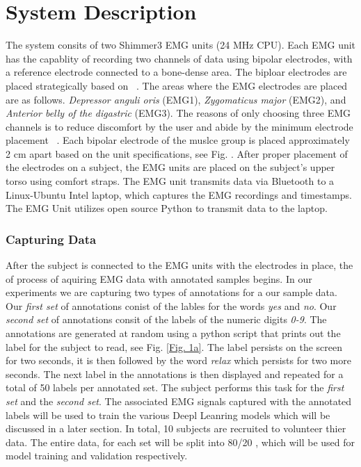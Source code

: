 \documentclass[conference]{IEEEtran}
\begin{document}
\section{System Description}
The system consits of two Shimmer3 EMG units (24 MHz CPU). Each EMG unit has the capablity of recording two channels of data using  bipolar electrodes, with a reference electrode connected to a bone-dense area. The biploar electrodes are placed strategically based on ~\cite{lopez-larraz_syllable-based_2010}. The areas where the EMG electrodes are placed are as follows. \textit{Depressor anguli oris} (EMG1), \textit{Zygomaticus major} (EMG2), and \textit{Anterior belly of the digastric} (EMG3). The reasons of only choosing three EMG channels is to reduce discomfort by the user and abide by the minimum electrode placement ~\cite{maier-hein_session_2005}. Each bipolar electrode of the muslce group is placed approximately 2 cm apart based on the unit specifications, see Fig. \pageref{Fig. 1b}. After proper placement of the electrodes on a subject, the EMG units are placed on the subject's upper torso using comfort straps. The EMG unit transmits data via Bluetooth to a Linux-Ubuntu Intel laptop, which captures the EMG recordings and timestamps. The EMG Unit utilizes open source Python to transmit data to the laptop.

\subsubsection*{Capturing Data}
After the subject is connected to the EMG units with the electrodes in place, the of process of aquiring EMG data with annotated samples begins. In our experiments we are capturing two types of annotations for a our sample data. Our \textit{first set} of annotations conist of the lables for the words \textit{yes} and \textit{no}. Our \textit{second set} of annotations consit of the labels of the numeric digits \textit{0-9}. The annotations are generated at random using a python script that prints out the label for the subject to read, see Fig.  \ref{Fig. 1a}. The label persists on the screen for two seconds, it is  then followed by the word \textit{relax} which persists for two more seconds. The next label in the annotations is then displayed and repeated for a total of 50 labels per annotated set. The subject performs this task for the \textit{first set} and the \textit{second set}. The associated EMG signals captured with the annotated labels will be used to train the various Deepl Leanring models which will be discussed in a later section. In total, 10 subjects are recruited to volunteer thier data. The entire data, for each set will be split into 80/20 , which will be used for model training and validation respectively. 
\end{document}

